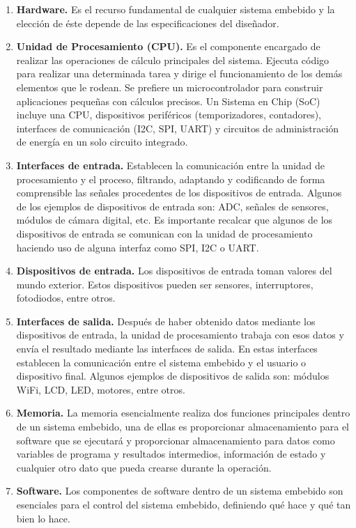 	\begin{enumerate}
		\item \textbf{Hardware.} Es el recurso fundamental de cualquier sistema embebido y la elección de éste depende de las especificaciones del diseñador.
		
		\item \textbf{Unidad de Procesamiento (CPU).} Es el componente encargado de realizar las operaciones de cálculo principales del sistema. Ejecuta código para realizar una determinada tarea y dirige el funcionamiento de los demás elementos que le rodean. Se prefiere un microcontrolador para construir aplicaciones pequeñas con cálculos precisos. Un Sistema en Chip (SoC) incluye una CPU, dispositivos periféricos (temporizadores, contadores), interfaces de comunicación (I2C, SPI, UART) y circuitos de administración de energía en un solo circuito integrado.
		
		\item \textbf{Interfaces de entrada.} Establecen la comunicación entre la unidad de procesamiento y el proceso, filtrando, adaptando y codificando de forma comprensible las señales procedentes de los dispositivos de entrada. Algunos de los ejemplos de dispositivos de entrada son: ADC, señales de sensores, módulos de cámara digital, etc. Es importante recalcar que algunos de los dispositivos de entrada se comunican con la unidad de procesamiento haciendo uso de alguna interfaz como SPI, I2C o UART.
		
		\item \textbf{Dispositivos de entrada.} Los dispositivos de entrada toman valores del mundo exterior. Estos dispositivos pueden ser sensores, interruptores, fotodiodos, entre otros.
	
		\item \textbf{Interfaces de salida.} Después de haber obtenido datos mediante los dispositivos de entrada, la unidad de procesamiento trabaja con esos datos y envía el resultado mediante las interfaces de salida. En estas interfaces establecen la comunicación entre el sistema embebido y el usuario o dispositivo final. Algunos ejemplos de dispositivos de salida son: módulos WiFi, LCD, LED, motores, entre otros. 
		
		\item \textbf{Memoria.} La memoria esencialmente realiza dos funciones principales dentro de un sistema embebido, una de ellas es proporcionar almacenamiento para el software que se ejecutará y proporcionar almacenamiento para datos como variables de programa y resultados intermedios, información de estado y cualquier otro dato que pueda crearse durante la operación.
		
		\item \textbf{Software.} Los componentes de software dentro de un sistema embebido son esenciales para el control del sistema embebido, definiendo qué hace y qué tan bien lo hace.
	\end{enumerate}
	
